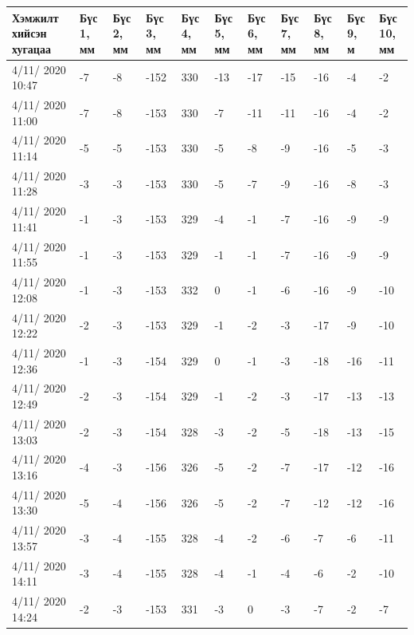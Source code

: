 \begin{table}[h]
    \centering
    \begin{tabular}{|p{1.5cm}|p{0.8cm}|p{0.8cm}|p{0.8cm}|p{0.8cm}|p{0.8cm}|p{0.8cm}|p{0.8cm}|p{0.8cm}|p{0.8cm}|p{0.8cm}|}
         \hline
     Хэмжилт хийсэн хугацаа & Бүс 1, мм&	Бүс 2, мм&	Бүс 3, мм&	Бүс 4, мм&	Бүс 5, мм&	Бүс 6, мм&	Бүс 7, мм&	Бүс 8, мм&	Бүс 9, м&	Бүс 10, мм \\ \hline
4/11/ 2020 10:47&	-7&	-8&	-152&	330&-13&-17&-15&-16&	-4&	-2 \\ \hline
4/11/ 2020 11:00&	-7&	-8&	-153&	330&-7&	-11&-11&-16&	-4&	-2 \\ \hline
4/11/ 2020 11:14&	-5&	-5&	-153&	330&-5&	-8&	-9&	-16&	-5&	-3 \\ \hline
4/11/ 2020 11:28&	-3&	-3&	-153&	330&-5&	-7&	-9&	-16&	-8&	-3 \\ \hline
4/11/ 2020 11:41&	-1&	-3&	-153&	329&-4&	-1&	-7&	-16&	-9&	-9 \\ \hline
4/11/ 2020 11:55&	-1&	-3&	-153&	329&-1&	-1&	-7&	-16&	-9&	-9 \\ \hline
4/11/ 2020 12:08&	-1&	-3&	-153&	332&0&	-1&	-6&	-16&	-9&	-10 \\ \hline
4/11/ 2020 12:22&	-2&	-3&	-153&	329&-1&	-2&	-3&	-17&	-9&	-10 \\ \hline
4/11/ 2020 12:36&	-1&	-3&	-154&	329&0&	-1&	-3&	-18&	-16&	-11 \\ \hline
4/11/ 2020 12:49&	-2&	-3&	-154&	329&-1&	-2&	-3&	-17&	-13&	-13 \\ \hline
4/11/ 2020 13:03&	-2&	-3&	-154&	328&-3&	-2&	-5&	-18&	-13&	-15 \\ \hline
4/11/ 2020 13:16&	-4&	-3&	-156&	326&-5&	-2&	-7&	-17&	-12&	-16 \\ \hline
4/11/ 2020 13:30&	-5&	-4&	-156&	326&-5&	-2&	-7&	-12&	-12&	-16 \\ \hline
4/11/ 2020 13:57&	-3&	-4&	-155&	328&-4&	-2&	-6&	-7 &	-6&	-11 \\ \hline
4/11/ 2020 14:11&	-3&	-4&	-155&	328&-4&	-1&	-4&	-6 &	-2&	-10 \\ \hline
4/11/ 2020 14:24&	-2&	-3&	-153&	331&-3&	0&	-3&	-7 &	-2&	-7 \\ \hline
    \end{tabular}
\end{table}
